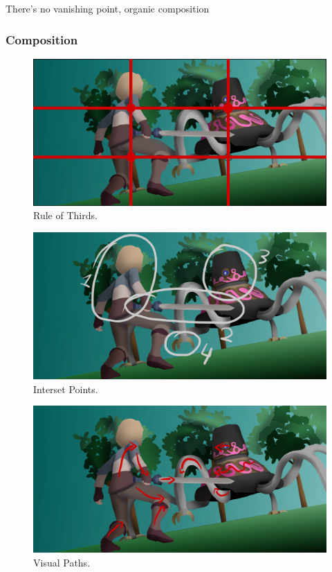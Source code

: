 \documentclass{cup-pan}
\begin{document}
            There's no vanishing point, organic composition

        \subsubsection{Composition}

            \begin{figure}[H]
                \includegraphics[width=\textwidth]{Imagenes/Fanart2/Analysis/Analysis.png}
                \caption{Rule of Thirds.}
            \end{figure}

            \begin{figure}[H]
                \includegraphics[width=\textwidth]{Imagenes/Fanart2/Analysis/puntos_interes.png}
                \caption{Interset Points.}
            \end{figure}

            \begin{figure}[H]
                \includegraphics[width=\textwidth]{Imagenes/Fanart2/Analysis/recorridos.png}
                \caption{Visual Paths.}
            \end{figure}
\end{document}

